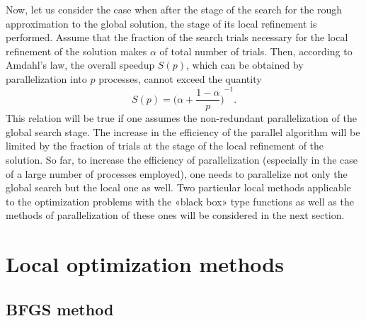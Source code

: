 \documentclass[runningheads]{llncs}
\begin{document}
Now, let us consider the case when after the stage of the search for the rough approximation to the global solution, the stage of its local refinement is performed. Assume that the fraction of the search trials necessary for the local refinement of the solution makes $\alpha$ of total number of trials. Then, according to Amdahl's law, the overall speedup $S(p)$, which can be obtained by parallelization into $p$ processes, cannot exceed the quantity 
$$ S(p) = {\Big(\alpha + \frac{1-\alpha}{p}\Big)}^{-1}.$$
This relation will be true if one assumes the non-redundant parallelization of the global search stage. The increase in the efficiency of the parallel algorithm will be limited by the fraction of trials at the stage of the local refinement of the solution. So far, to increase the efficiency of parallelization (especially in the case of a large number of processes employed), one needs to parallelize not only the global search but the local one as well. Two particular local methods applicable to the optimization problems with the «black box» type functions as well as the methods of parallelization of these ones will be considered in the next section.

\section{Local optimization methods}
\subsection{BFGS method}
\end{document}
